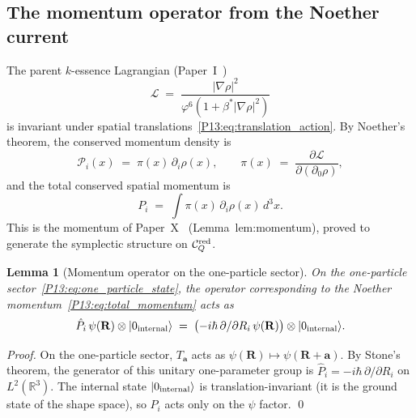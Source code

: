 \documentclass[11pt,a4paper]{article}
\newtheorem{lemma}[theorem]{Lemma}
\theoremstyle{definition}
\theoremstyle{remark}
\newcommand{\vp}{\varphi}
\newcommand{\bst}{\beta^{*}}
\begin{document}
\subsection{The momentum operator from the Noether current}
\label{P13:sec:momentum_operator}

The parent $k$-essence Lagrangian (Paper~I~\cite{Paper1})
\begin{equation}
  \mathcal{L} \;=\; \frac{|\nabla\rho|^2}{\vp^6(1+\bst|\nabla\rho|^2)}
  \label{P13:eq:parent_L}
\end{equation}
is invariant under spatial translations~\eqref{P13:eq:translation_action}.
By Noether's theorem, the conserved momentum density is
\begin{equation}
  \mathcal{P}_i(x)
  \;=\; \pi(x)\,\partial_i\rho(x),
  \qquad
  \pi(x) \;=\; \frac{\partial\mathcal{L}}{\partial(\partial_0\rho)},
  \label{P13:eq:noether_momentum}
\end{equation}
and the total conserved spatial momentum is
\begin{equation}
  P_i \;=\; \int \pi(x)\,\partial_i\rho(x)\,d^3x.
  \label{P13:eq:total_momentum}
\end{equation}
This is the momentum of Paper~X~\cite{Paper10} (Lemma~lem:momentum),
proved to generate the symplectic structure on $\mathcal{C}_Q^{\rm red}$.

\begin{lemma}[Momentum operator on the one-particle sector]
\label{P13:lem:momentum_operator}
On the one-particle sector~\eqref{P13:eq:one_particle_state},
the operator corresponding to the Noether momentum~\eqref{P13:eq:total_momentum}
acts as
\begin{equation}
  \hat{P}_i\,\psi(\mathbf{R})\otimes|0_{\rm internal}\rangle
  \;=\; \bigl(-i\hbar\,\partial/\partial R_i\,\psi(\mathbf{R})\bigr)
        \otimes|0_{\rm internal}\rangle.
  \label{P13:eq:momentum_on_sector}
\end{equation}
\end{lemma}

\begin{proof}
On the one-particle sector, $T_{\mathbf{a}}$ acts as
$\psi(\mathbf{R})\mapsto\psi(\mathbf{R}+\mathbf{a})$.
By Stone's theorem, the generator of this unitary one-parameter group
is $\hat{P}_i = -i\hbar\,\partial/\partial R_i$
on $L^2(\mathbb{R}^3)$.
The internal state $|0_{\rm internal}\rangle$ is translation-invariant
(it is the ground state of the shape space), so $P_i$
acts only on the $\psi$ factor.
\qed
\end{proof}
\end{document}
